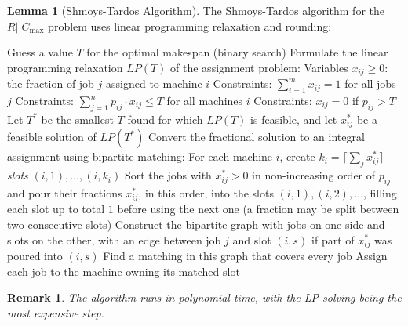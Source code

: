 \documentclass{article}
\newtheorem{remark}{Remark}
\theoremstyle{definition}
\newtheorem{lemma}{Lemma}
\begin{document}
\begin{lemma}[Shmoys-Tardos Algorithm]
The Shmoys-Tardos algorithm for the $R||C_{\max}$ problem uses linear programming relaxation and rounding:

\begin{algorithm}
\caption{Shmoys-Tardos Algorithm}
\begin{algorithmic}[1]
    \State Guess a value $T$ for the optimal makespan (binary search)
    \State Formulate the linear programming relaxation $LP(T)$ of the assignment problem:
    \State \quad Variables $x_{ij} \geq 0$: the fraction of job $j$ assigned to machine $i$
    \State \quad Constraints: $\sum_{i=1}^{m} x_{ij} = 1$ for all jobs $j$
    \State \quad Constraints: $\sum_{j=1}^{n} p_{ij} \cdot x_{ij} \leq T$ for all machines $i$
    \State \quad Constraints: $x_{ij} = 0$ if $p_{ij} > T$
    \State Let $T^*$ be the smallest $T$ found for which $LP(T)$ is feasible, and let $x_{ij}^*$ be a feasible solution of $LP(T^*)$
    \State Convert the fractional solution to an integral assignment using bipartite matching:
    \State \quad For each machine $i$, create $k_i = \lceil \sum_{j} x_{ij}^* \rceil$ \emph{slots} $(i,1), \ldots, (i,k_i)$
    \State \quad Sort the jobs with $x_{ij}^* > 0$ in non-increasing order of $p_{ij}$ and pour their fractions $x_{ij}^*$, in this order, into the slots $(i,1), (i,2), \ldots$, filling each slot up to total $1$ before using the next one (a fraction may be split between two consecutive slots)
    \State \quad Construct the bipartite graph with jobs on one side and slots on the other, with an edge between job $j$ and slot $(i,s)$ if part of $x_{ij}^*$ was poured into $(i,s)$
    \State \quad Find a matching in this graph that covers every job
    \State Assign each job to the machine owning its matched slot
\end{algorithmic}
\end{algorithm}

\begin{remark}
The algorithm runs in polynomial time, with the LP solving being the most expensive step.
\end{remark}
\end{lemma}
\end{document}
